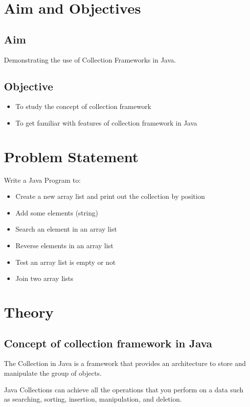 \documentclass[11pt]{article}
\begin{document}
\tableofcontents
\thispagestyle{empty}
\clearpage


\setcounter{page}{1}

\section{Aim and Objectives}
\subsection*{Aim}
Demonstrating the use of Collection Frameworks in Java.
\subsection*{Objective}
\begin{itemize}
	\item To study the concept of collection framework
	\item To get familiar with features of collection framework in Java
\end{itemize}
\section{Problem Statement}
Write a Java Program to: 
\begin{itemize}
	\item Create a new array list and print out the collection by position
	\item Add some elements (string)
	\item Search an element in an array list
	\item Reverse elements in an array list
	\item Test an array list is empty or not
	\item Join two array lists
\end{itemize}
	
\section{Theory}
\subsection{Concept of collection framework in Java}
The Collection in Java is a framework that provides an architecture to store and manipulate the group of objects.

Java Collections can achieve all the operations that you perform on a data such as searching, sorting, insertion, manipulation, and deletion.
\end{document}
